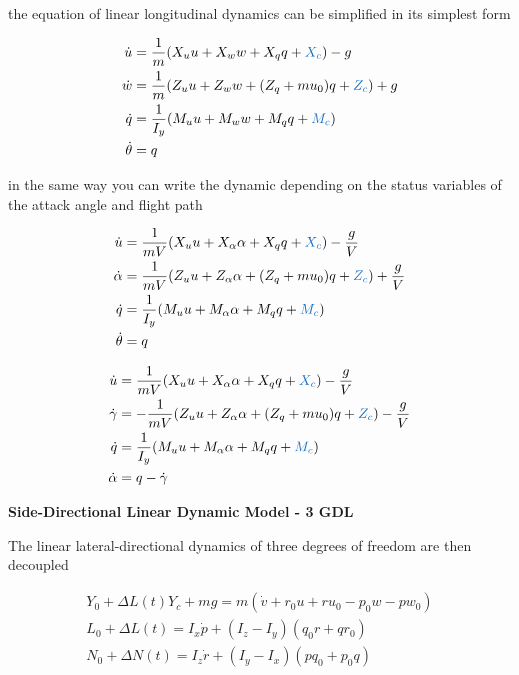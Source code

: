 the equation of linear longitudinal dynamics can be simplified in its simplest form

\begin{align}
\label{lineal longitudinal cuerpo}
    \dot u &=\frac{1}{m}(X_u u + X_w w + X_q q + \textcolor{RoyalBlue}{X_c}) - g \\
    \dot w &= \frac{1}{m}(Z_u u + Z_w w + (Z_q + mu_0) q + \textcolor{RoyalBlue}{Z_c}) + g \\
    \dot q &= \frac{1}{I_y}(M_u u + M_w w + M_q q + \textcolor{RoyalBlue}{M_c}) \\  
    \dot \theta &= q
\label{lineal longitudinal cuerpo 1}
\end{align}

in the same way you can write the dynamic depending on the status variables of the attack angle and flight path


\begin{align}
    \dot u &=\frac{1}{mV}(X_u u + X_\alpha \alpha + X_q q + \textcolor{RoyalBlue}{X_c}) - \frac{g}{V} \\
    \dot \alpha &= \frac{1}{mV}(Z_u u + Z_\alpha \alpha + (Z_q + mu_0) q + \textcolor{RoyalBlue}{Z_c}) + \frac{g}{V} \\
    \dot q &= \frac{1}{I_y}(M_u u + M_\alpha \alpha + M_q q + \textcolor{RoyalBlue}{M_c}) \\  
    \dot \theta &= q
\end{align}

\begin{align}
    \dot u &=\frac{1}{mV}(X_u u + X_\alpha \alpha + X_q q + \textcolor{RoyalBlue}{X_c}) - \frac{g}{V} \\
    \dot \gamma &= -\frac{1}{mV}(Z_u u + Z_\alpha \alpha + (Z_q + mu_0) q + \textcolor{RoyalBlue}{Z_c}) - \frac{g}{V} \\
    \dot q &= \frac{1}{I_y}(M_u u + M_\alpha \alpha + M_q q + \textcolor{RoyalBlue}{M_c}) \\  
    \dot \alpha &= q - \dot \gamma
\end{align}

\textbf{Side-Directional Linear Dynamic Model - 3 GDL}


The linear lateral-directional dynamics of three degrees of freedom are then decoupled


\begin{gather}
    Y_0 + \Delta L(t) Y_c + mg = m (\dot v + r_0 u + r u_0 - p_0 w - p w_0) \\
    L_0 + \Delta L(t) = I_x \dot p + (I_z - I_y)(q_0 r + q r_0) \\
    N_0 + \Delta N(t) = I_z \dot r + (I_y - I_x)(p q_0 + p_0 q)
\end{gather}

